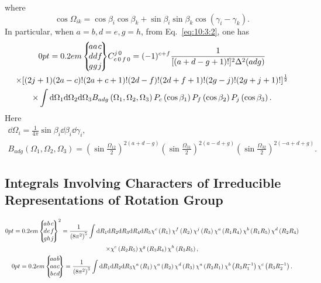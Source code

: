 where
\begin{equation}
\cos \Omega_{i k}=\cos \beta_{i} \cos \beta_{k}+\sin \beta_{i} \sin \beta_{k} \cos \left(\gamma_{i}-\gamma_{k}\right). \label{eq:10:3:9}
\end{equation}
In particular, when $a=b, d=e, g=h$, from Eq.~\eqref{eq:10:3:2}, one has \cite{ref063}
\begin{multline}
\ninej{a}{a}{c}{d}{d}{f}{g}{g}{j} \clebsch{c}{0}{f}{0}{j}{0}=(-1)^{c+f} \frac{1}{[(a+d-g+1)!]^{2} \Delta^{2}(a d g)}  \\
\times[(2 j+1)(2 a-c)!(2 a+c+1)!(2 d-f)!(2 d+f+1)!(2 g-j)!(2 g+j+1)!]^{\frac{1}{2}}  \\
\times \int \dd \Omega_{1} \dd \Omega_{2} \dd \Omega_{3} B_{a d g}\left(\Omega_{1}, \Omega_{2}, \Omega_{3}\right) P_{c}\left(\cos \beta_{1}\right) P_{f}\left(\cos \beta_{2}\right) P_{j}\left(\cos \beta_{3}\right). \label{eq:10:3:10}
\end{multline}
Here
\begin{gather}
\dd \Omega_{i}=\frac{1}{4 \pi} \sin \beta_{i} \dd \beta_{i} \dd \gamma_{i} , \label{eq:10:3:11}\\
B_{a d g}\left(\Omega_{1}, \Omega_{2}, \Omega_{3}\right)=\left(\sin \frac{\Omega_{12}}{2}\right)^{2(a+d-g)}\left(\sin \frac{\Omega_{31}}{2}\right)^{2(a-d+g)}\left(\sin \frac{\Omega_{32}}{2}\right)^{2(-a+d+g)} . \label{eq:10:3:12}
\end{gather}
\subsection{Integrals Involving Characters of Irreducible Representations of Rotation Group}\label{sec:10.3.3}
\begin{gather}
\ninej{a}{b}{c}{d}{e}{f}{g}{h}{j}^{2}=\frac{1}{\left(8 \pi^{2}\right)^{5}} \int \dd R_{1} \dd R_{2} \dd R_{3} \dd R_{4} \dd R_{5} \chi^{c}\left(R_{1}\right) \chi^{f}\left(R_{2}\right) \chi^{j}\left(R_{3}\right) \chi^{a}\left(R_{1} R_{4}\right) \chi^{b}\left(R_{1} R_{5}\right) \chi^{d}\left(R_{2} R_{4}\right)  \notag\\
\times \chi^{e}\left(R_{2} R_{5}\right) \chi^{g}\left(R_{3} R_{4}\right) \chi^{h}\left(R_{3} R_{5}\right)  ,\label{eq:10:3:13}\\
\ninej{a}{a}{b}{a}{a}{c}{b}{c}{d}=\frac{1}{\left(8 \pi^{2}\right)^{3}} \int \dd R_{1} \dd R_{2} \dd R_{3} \chi^{a}\left(R_{1}\right) \chi^{a}\left(R_{2}\right) \chi^{d}\left(R_{3}\right) \chi^{a}\left(R_{2} R_{1}\right) \chi^{b}\left(R_{3} R_{1}^{-1}\right) \chi^{c}\left(R_{3} R_{2}^{-1}\right). \label{eq:10:3:14}
\end{gather}

